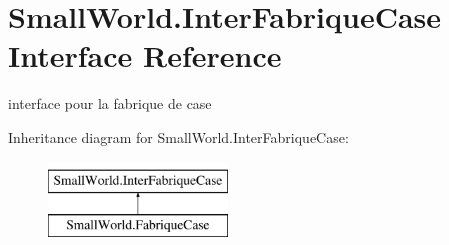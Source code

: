 \hypertarget{interface_small_world_1_1_inter_fabrique_case}{\section{Small\-World.\-Inter\-Fabrique\-Case Interface Reference}
\label{interface_small_world_1_1_inter_fabrique_case}
}


interface pour la fabrique de case  


Inheritance diagram for Small\-World.\-Inter\-Fabrique\-Case\-:\begin{figure}[H]
\begin{center}
\leavevmode
\includegraphics[height=2.000000cm]{interface_small_world_1_1_inter_fabrique_case}
\end{center}
\end{figure}
